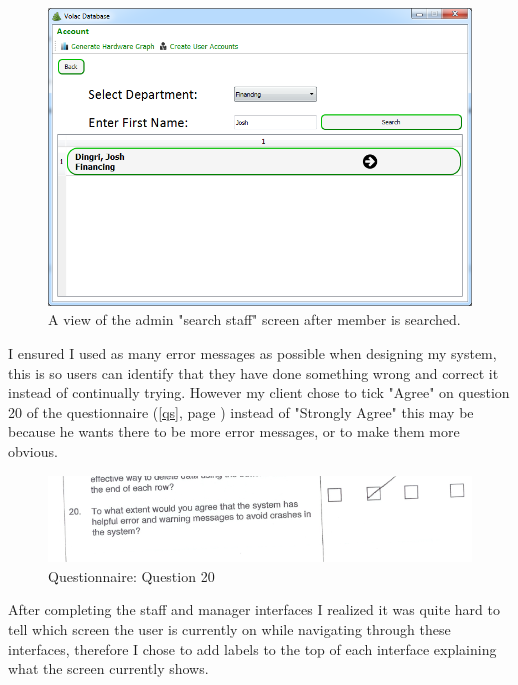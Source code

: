 \begin{figure}[H]
    \includegraphics[width=\textwidth]{./Evaluation/Images/afteradv.png}
    \caption{A view of the admin "search staff" screen after member is searched.}
\end{figure}

I ensured I used as many error messages as possible when designing my system, this is so users can identify that they have done something wrong and correct it instead of continually trying. However my client chose to tick "Agree" on question 20 of the questionnaire (\ref{qs}, page \pageref{qs}) instead of "Strongly Agree" this may be because he wants there to be more error messages, or to make them more obvious.

\begin{figure}[H]
    \includegraphics[width=\textwidth]{./Evaluation/EvaluationQuestionnaire/20.png}
    \caption{Questionnaire: Question 20} 
\end{figure}

After completing the staff and manager interfaces I realized it was quite hard to tell which screen the user is currently on while navigating through these interfaces, therefore I chose to add labels to the top of each interface explaining what the screen currently shows.

